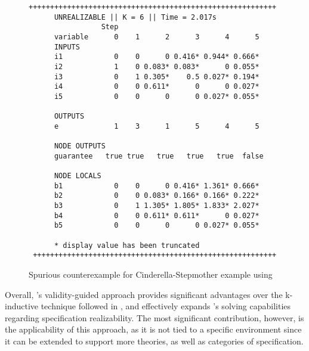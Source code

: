 \begin{figure}[!t]
\centering
 \begin{Verbatim}[fontsize=\scriptsize]
 ++++++++++++++++++++++++++++++++++++++++++++++++++++++++++
      UNREALIZABLE || K = 6 || Time = 2.017s
                 Step
      variable      0    1      2      3      4      5
      INPUTS
      i1            0    0      0 0.416* 0.944* 0.666*
      i2            1    0 0.083* 0.083*      0 0.055*
      i3            0    1 0.305*    0.5 0.027* 0.194*
      i4            0    0 0.611*      0      0 0.027*
      i5            0    0      0      0 0.027* 0.055*

      OUTPUTS
      e             1    3      1      5      4      5

      NODE OUTPUTS
      guarantee   true true   true   true   true  false

      NODE LOCALS
      b1            0    0      0 0.416* 1.361* 0.666*
      b2            0    0 0.083* 0.166* 0.166* 0.222*
      b3            0    1 1.305* 1.805* 1.833* 2.027*
      b4            0    0 0.611* 0.611*      0 0.027*
      b5            0    0      0      0 0.027* 0.055*

      * display value has been truncated
 +++++++++++++++++++++++++++++++++++++++++++++++++++++++++
 \end{Verbatim}
\caption{Spurious counterexample for Cinderella-Stepmother example using \jsyn}

\label{fg:cex}
\end{figure}

Overall, \jsynvg's validity-guided approach provides significant advantages
over the k-inductive technique followed in \jsyn, and effectively expands
\jkind's solving capabilities regarding specification realizability. The most
significant contribution, however, is the applicability of this approach, as it
is not tied to a specific environment since it can be extended to support more
theories, as well as categories of specification.
